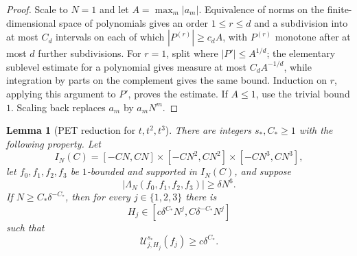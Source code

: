 \documentclass[11pt]{article}
\newtheorem{lemma}[theorem]{Lemma}
\newcommand{\abs}[1]{\left|#1\right|}
\newcommand{\indices}{\{1,2,3\}}
\begin{document}
	\begin{proof}
		Scale to \(N=1\) and let \(A=\max_m\abs{a_m}\).  Equivalence of norms on the finite-dimensional space of polynomials gives an order \(1\leq r\leq d\) and a subdivision into at most \(C_d\) intervals on each of which
		\(\abs{P^{(r)}}\geq c_dA\), with \(P^{(r)}\) monotone after at most \(d\) further subdivisions.  For \(r=1\), split where \(\abs{P'}\leq A^{1/d}\); the elementary sublevel estimate for a polynomial gives measure at most \(C_dA^{-1/d}\), while integration by parts on the complement gives the same bound.  Induction on \(r\), applying this argument to \(P'\), proves the estimate.  If \(A\leq1\), use the trivial bound \(1\).  Scaling back replaces \(a_m\) by \(a_mN^m\).
	\end{proof}
	
	\begin{lemma}[PET reduction for \(t,t^2,t^3\)]\label{lem:pet-reduction}
		There are integers \(s_\ast,C_\ast\geq1\) with the following property.  Let
		\[
		I_N(C)=
		[-CN,CN]\times[-CN^2,CN^2]\times[-CN^3,CN^3],
		\]
		let \(f_0,f_1,f_2,f_3\) be \(1\)-bounded and supported in \(I_N(C)\), and suppose
		\[
		\abs{\Lambda_N(f_0,f_1,f_2,f_3)}\geq\delta N^6.
		\]
		If \(N\geq C_\ast\delta^{-C_\ast}\), then for every \(j\in\indices\) there is
		\[
		H_j\in[c\delta^{C_\ast}N^j,C\delta^{-C_\ast}N^j]
		\]
		such that
		\[
		\mathcal U^{s_\ast}_{j,H_j}(f_j)\geq c\delta^{C_\ast}.
		\]
	\end{lemma}
	
\end{document}
